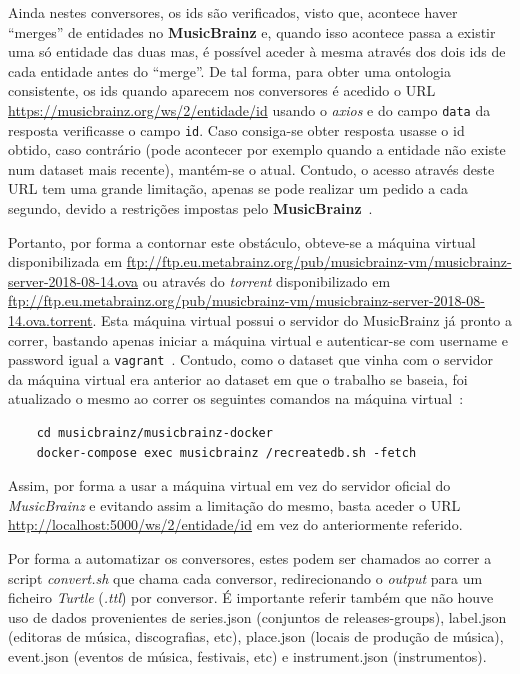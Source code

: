 \documentclass{article}
\begin{document}
Ainda nestes conversores, os ids são verificados, visto que, acontece haver ``merges'' de entidades no \textbf{MusicBrainz} e, quando isso acontece passa a existir uma só entidade das duas mas, é possível aceder à mesma através dos dois ids de cada entidade antes do ``merge''. De tal forma, para obter uma ontologia consistente, os ids quando aparecem nos conversores é acedido o URL \url{https://musicbrainz.org/ws/2/entidade/id} usando o \textit{axios} e do campo \texttt{data} da resposta verificasse o campo \texttt{id}. Caso consiga-se obter resposta usasse o id obtido, caso contrário (pode acontecer por exemplo quando a entidade não existe num dataset mais recente), mantém-se o atual. Contudo, o acesso através deste URL tem uma grande limitação, apenas se pode realizar um pedido a cada segundo, devido a restrições impostas pelo \textbf{MusicBrainz}~\cite{mbLimit}. 

Portanto, por forma a contornar este obstáculo, obteve-se a máquina virtual disponibilizada em \url{ftp://ftp.eu.metabrainz.org/pub/musicbrainz-vm/musicbrainz-server-2018-08-14.ova} ou através do \textit{torrent} disponibilizado em \url{ftp://ftp.eu.metabrainz.org/pub/musicbrainz-vm/musicbrainz-server-2018-08-14.ova.torrent}. Esta máquina virtual possui o servidor do MusicBrainz já pronto a correr, bastando apenas iniciar a máquina virtual e autenticar-se com username e password igual a \texttt{vagrant}~\cite{mbSetup}. Contudo, como o dataset que vinha com o servidor da máquina virtual era anterior ao dataset em que o trabalho se baseia, foi atualizado o mesmo ao correr os seguintes comandos na máquina virtual~\cite{mbUpdate}:

\begin{framed}
\begin{verbatim}
    cd musicbrainz/musicbrainz-docker
    docker-compose exec musicbrainz /recreatedb.sh -fetch
\end{verbatim}
\end{framed}

Assim, por forma a usar a máquina virtual em vez do servidor oficial do \textit{MusicBrainz} e evitando assim a limitação do mesmo, basta aceder o URL \url{http://localhost:5000/ws/2/entidade/id} em vez do anteriormente referido.

Por forma a automatizar os conversores, estes podem ser chamados ao correr a script \textit{convert.sh} que chama cada conversor, redirecionando o \textit{output} para um ficheiro \textit{Turtle} (\textit{.ttl}) por conversor. É importante referir também que não houve uso de dados provenientes de series.json (conjuntos de releases-groups), label.json (editoras de música, discografias, etc), place.json (locais de produção de música), event.json (eventos de música, festivais, etc) e instrument.json (instrumentos).
\end{document}

